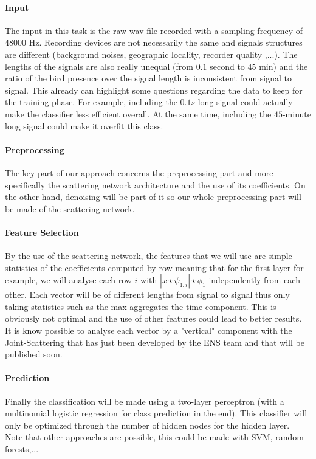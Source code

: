 \documentclass[a4paper]{report}
\begin{document}
\paragraph{Input}
The input in this task is the raw wav file recorded with a sampling frequency of $48000$ Hz. Recording devices are not necessarily the same and signals structures are different (background noises, geographic locality, recorder quality ,...). The lengths of the signals are also really unequal (from $0.1$ second to $45$ min) and the ratio of the bird presence over the signal length is inconsistent from signal to signal. This already can highlight some questions regarding the data to keep for the training phase. For example, including the $0.1s$ long signal could actually make the classifier less efficient overall. At the same time, including the $45$-minute long signal could make it overfit this class.
\paragraph{Preprocessing}
The key part of our approach concerns the preprocessing part and more specifically the scattering network architecture and the use of its coefficients. On the other hand,  denoising will be part of it so our whole preprocessing part will be made of the scattering network.
\paragraph{Feature Selection}
By the use of the scattering network, the features that we will use are simple statistics of the coefficients computed by row meaning that for the first layer for example,  we will analyse each row $i$ with $|x \star \psi_{1,i}|\star \phi_1$ independently from each other. Each vector will be of different lengths from signal to signal thus only taking statistics such as the max aggregates the time component. This is obviously not optimal and the use of other features could lead to better results.\\
It is know possible to analyse each vector by a "vertical" component with the Joint-Scattering that has just been developed by the ENS team and that will be published soon.
\paragraph{Prediction}
Finally the classification will be made using a two-layer perceptron (with a multinomial logistic regression for class prediction in the end). This classifier will only be optimized through the number of hidden nodes for the hidden layer.\\
Note that other approaches are possible, this could be made with SVM, random forests,...
\end{document}
